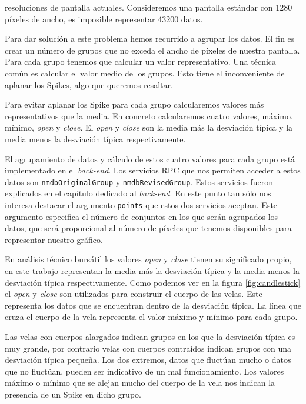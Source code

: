		resoluciones de pantalla actuales. Consideremos una pantalla estándar con 1280 píxeles de ancho, es imposible representar 43200 datos.
		\par
		Para dar solución a este problema hemos recurrido a agrupar los datos. El fin es crear un número de grupos que no exceda el ancho de
		píxeles de nuestra pantalla. Para cada grupo tenemos que calcular un valor representativo. Una técnica común es calcular el valor
		medio de los grupos.  Esto tiene el inconveniente de aplanar los Spikes, algo que queremos resaltar.
		\par
		Para evitar aplanar los Spike para cada grupo calcularemos valores más representativos que la media. En concreto calcularemos cuatro
		valores, máximo, mínimo, \emph{open} y \emph{close}. El \emph{open} y \emph{close} son la media más la desviación típica y la media
		menos la desviación típica respectivamente.
		\par
		El agrupamiento de datos y cálculo de estos cuatro valores para cada grupo está implementado en el \emph{back-end}. Los servicios RPC
		que nos permiten acceder a estos datos son \texttt{nmdbOriginalGroup} y \texttt{nmdbRevisedGroup}. Estos servicios fueron explicados
		en el capítulo dedicado al \emph{back-end}. En este punto tan sólo nos interesa destacar el argumento \texttt{points} que estos dos
		servicios aceptan. Este argumento especifica el número de conjuntos en los que serán agrupados los datos, que será proporcional al
		número de píxeles que tenemos disponibles para representar nuestro gráfico. 
		\par
		En análisis técnico bursátil los valores \emph{open} y \emph{close} tienen su significado propio, en este trabajo representan la media
		más la desviación típica y la media menos la desviación típica respectivamente. Como podemos ver en la figura \ref{fig:candlestick} el
		\emph{open} y \emph{close} son utilizados para construir el cuerpo de las velas. Este representa los datos que se encuentran dentro de
		la desviación típica. La línea que cruza el cuerpo de la vela representa el valor máximo y mínimo para cada grupo.
		\par
		Las velas con cuerpos alargados indican grupos en los que la desviación típica es muy grande, por contrario velas con cuerpos
		contraídos indican grupos con una desviación típica pequeña. Los dos extremos, datos que fluctúan mucho o datos que no fluctúan,
		pueden ser indicativo de un mal funcionamiento. Los valores máximo o mínimo que se alejan mucho del cuerpo de la vela nos indican la
		presencia de un Spike en dicho grupo. 	
